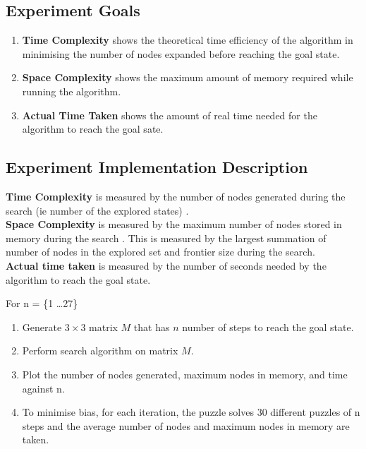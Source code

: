 \documentclass[runningheads]{llncs}
\begin{document}
\subsection{Experiment Goals}
\begin{enumerate}
    \item \textbf{Time Complexity} shows the theoretical time efficiency of the algorithm in minimising the number of nodes expanded before reaching the goal state.
    \item \textbf{Space Complexity} shows the maximum amount of memory required while running the algorithm.
    \item \textbf{Actual Time Taken} shows the amount of real time needed for the algorithm to reach the goal sate.
\end{enumerate}

\subsection{Experiment Implementation Description}
\textbf{Time Complexity} is measured by the number of nodes generated during the search (ie number of the explored states) \cite[p80]{stuart_russell_artifical_2010}. \\
\textbf{Space Complexity} is measured by the maximum number of nodes stored in memory during the search \cite[p80]{stuart_russell_artifical_2010}. This is measured by the largest summation of number of nodes in the explored set and frontier size during the search. \\
\textbf{Actual time taken} is measured by the number of seconds needed by the algorithm to reach the goal state.

For n = \{1 \dots 27\}
\begin{enumerate}
    \item Generate \(3 \times 3 \) matrix \( M \) that has \( n \) number of steps to reach the goal state.
    \item Perform search algorithm on matrix \( M \).
    \item Plot the number of nodes generated, maximum nodes in memory, and time against n. %
    \item To minimise bias, for each iteration, the puzzle solves 30 different puzzles of n steps and the average number of nodes and maximum nodes in memory are taken.
\end{enumerate}
\end{document}
